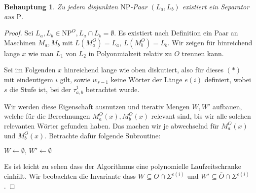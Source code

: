\documentclass[nofonts]{uebung}
\newtheorem{claim}[theorem]{Behauptung}
\theoremstyle{definition}
\def\P{\ensuremath{\mathrm{P}}}
\def\NP{\ensuremath{\mathrm{NP}}}
\begin{document}
\begin{claim}
    Zu jedem disjunkten \NP-Paar $(L_a, L_b)$ existiert ein Separator aus $\P$.
\end{claim}
\begin{proof}
    Sei $L_a, L_b\in\NP^O, L_a\cap L_b=\emptyset$. Es existiert nach Definition ein Paar an Maschinen $M_a, M_b$ mit $L(M_a^O)=L_a$, $L(M_b^O)=L_b$.
    Wir zeigen für hinreichend lange $x$ wie man $L_1$ von $L_2$ in Polyonmialzeit relativ zu $O$ trennen kann.
    
    Sei im Folgenden $x$ hinreichend lange wie oben diskutiert, also für dieses $(\ast)$ mit eindeutigem $i$ gilt, sowie $w_{s-1}$ keine Wörter der Länge $e(i)$ definiert, wobei $s$ die Stufe ist, bei der $\tau^1_{a,b}$ betrachtet wurde.

    Wir werden diese Eigenschaft ausnutzen und iterativ Mengen $W, W'$ aufbauen, welche für die Berechnungen $M_a^O(x), M_b^O(x)$ relevant sind, bis wir alle solchen relevanten Wörter gefunden haben.
    Das machen wir je abwechselnd für $M_a^O(x)$ und $M_b^O(x)$.
    Betrachte dafür folgende Subroutine:

    \noindent%
    \begin{algorithm}[H]
        $W\gets\emptyset,\, W'\gets\emptyset$\;
    \end{algorithm}
Es ist leicht zu sehen dass der Algorithmus eine polynomielle Laufzeitschranke einhält.
Wir beobachten die Invariante dass $W\subseteq O\cap\Sigma^{e(i)}$ und $W'\subseteq \overline{O}\cap\Sigma^{e(i)}$. 


\end{proof}
\end{document}
